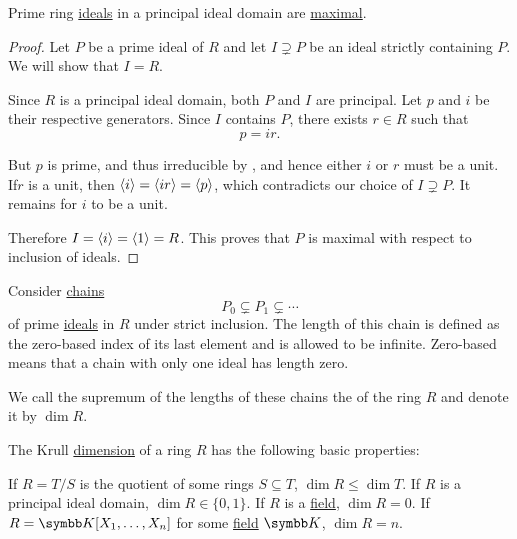 \begin{proposition}\label{thm:prime_ideals_are_maximal_in_pid}
  Prime ring \hyperref[def:prime_ring_ideal]{ideals} in a principal ideal domain are \hyperref[def:maximal_ring_ideal]{maximal}.
\end{proposition}
\begin{proof}
  Let \( P \) be a prime ideal of \( R \) and let \( I \supsetneq P \) be an ideal strictly containing \( P \). We will show that \( I = R \).

  Since \( R \) is a principal ideal domain, both \( P \) and \( I \) are principal. Let \( p \) and \( i \) be their respective generators. Since \( I \) contains \( P \), there exists \( r \in R \) such that
  \begin{equation*}
    p = ir.
  \end{equation*}

  But \( p \) is prime, and thus irreducible by , and hence either \( i \) or \( r \) must be a unit. If\LEM \( r \) is a unit, then \( \left\langle i \right\rangle = \left\langle ir \right\rangle = \left\langle p \right\rangle \), which contradicts our choice of \( I \supsetneq P \). It remains for \( i \) to be a unit.

  Therefore \( I = \left\langle i \right\rangle = \left\langle 1 \right\rangle = R \). This proves that \( P \) is maximal with respect to inclusion of ideals.
\end{proof}

\begin{definition}\label{def:krull_dimension}
  Consider \hyperref[def:tower_diagram]{chains}
  \begin{equation*}
    P_0 \subsetneq P_1 \subsetneq \cdots
  \end{equation*}
  of prime \hyperref[def:prime_ring_ideal]{ideals} in \( R \) under strict inclusion. The length of this chain is defined as the zero-based index of its last element and is allowed to be infinite. Zero-based means that a chain with only one ideal has length zero.

  We call the supremum of the lengths of these chains the  of the ring \( R \) and denote it by \( \dim R \).
\end{definition}

\begin{proposition}\label{thm:krull_dimension_properties}
  The Krull \hyperref[def:krull_dimension]{dimension} of a ring \( R \) has the following basic properties:
  \begin{PropEnum}
     If \( R = T / S \) is the quotient of some rings \( S \subseteq T \), \( \dim R \leq \dim T \).
     If \( R \) is a principal ideal domain, \( \dim R \in \{ 0, 1 \} \).
     If \( R \) is a \hyperref[def:field]{field}, \( \dim R = 0 \).
    \cite[exercise 8.19]{Коцев2016} If \( R = \BK[X_1, \ldots, X_n] \) for some \hyperref[def:field]{field} \( \BK \), \( \dim R = n \).
  \end{PropEnum}
\end{proposition}

